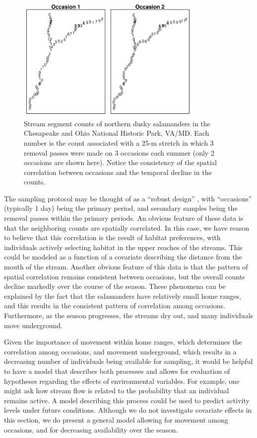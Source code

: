 \begin{figure}
  \centering
  \includegraphics[width=0.8\textwidth]{Ch18-Unmarked/figs/saln27}
  \caption{Stream segment counts of northern dusky salamanders
    in the Chesapeake and Ohio National Historic Park,
    VA/MD. Each number is the count associated with a 25-m stretch in which 3 removal passes
    were made on 3 occasions each summer (only 2 occasions are shown
    here). Notice the consistency of the spatial correlation between
    occasions and the temporal decline in the counts.}
  \label{unmarked.fig.salct}
\end{figure}


The sampling protocol may be
thought of as a ``robust design'' \citep{pollock:1982}, with
``occasions'' (typically 1 day) being the primary period, and
secondary samples being the removal passes within the primary
periods. An obvious feature of these data is that the neighboring
counts are spatially correlated. In this case, we have reason to
believe that this correlation is the result of habitat preferences,
with individuals actively selecting habitat in the upper reaches of
the streams. This could be modeled as a function of a covariate
describing the distance from the mouth of the stream. Another obvious
feature of this data is that the pattern of spatial correlation
remains consistent between occasions, but the overall counts decline
markedly over the course of the season.
These phenomena can be explained by the fact that the salamanders have
relatively small home ranges, and this results in the consistent pattern of
correlation  among occasions. Furthermore, as the season progresses, the
streams dry out, and many individuals move underground.

Given the importance of movement within home ranges, which determines
the correlation among occasions, and movement underground, which
results in a decreasing number of individuals being available for
sampling, it would be helpful to have a model that describes both
processes and allows for evaluation of hypotheses regarding the
effects of environmental variables. For example, one might ask how
stream flow is related to the probability that an individual remains
active.
A model describing this process could be used to predict
activity levels under future conditions. Although we do not
investigate covariate effects in this section, we do present a general
model allowing for movement among occasions, and for decreasing
availability over the season.

